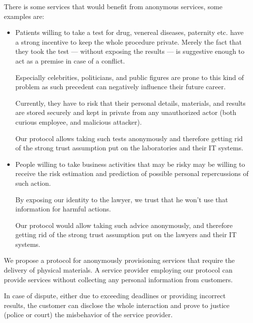 \documentclass{ieeeaccess}
\begin{document}
There is some services that would benefit from anonymous services, some examples are:
\begin{itemize}
    \item Patients willing to take a 
    test for drug, venereal diseases, paternity etc. have a strong incentive to keep the whole procedure private. Merely the fact that they took the test — without exposing the results — is suggestive enough to act as a premise in case of a conflict.

Especially celebrities, politicians, and public figures are prone to this kind of problem as such precedent can negatively influence their future career.

Currently, they have to risk that their personal details, materials, and results are stored securely and kept in private from any unauthorized actor (both curious employee, and malicious attacker).

Our protocol allows taking such tests anonymously and therefore getting
rid of the strong trust assumption put on the laboratories and their IT
systems.
\item People willing to take business activities that may be risky %
may be willing to receive the risk estimation and prediction of possible personal repercussions of such action.

By exposing our identity to the lawyer, we trust that he won't use that
information for harmful actions.

Our protocol would allow taking such advice anonymously, and therefore
getting rid of the strong trust assumption put on the lawyers and their IT systems.
\end{itemize}

We propose a protocol for anonymously provisioning services that require the delivery of physical materials. A service provider employing our protocol can provide services without collecting any personal information from customers.

In case of dispute, either due to exceeding deadlines or providing
incorrect results, the customer can disclose the whole interaction and
prove to justice (police or court) the misbehavior of the service 
provider.
\end{document}
